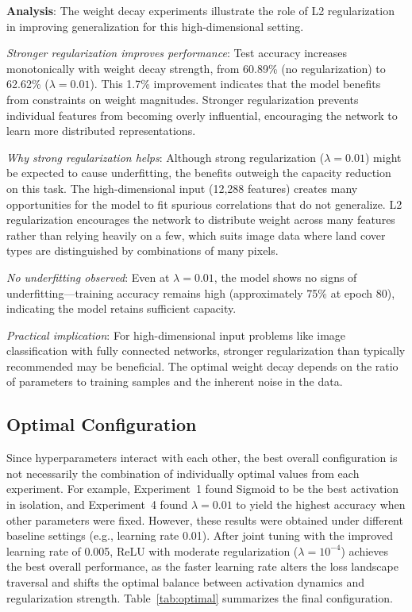\documentclass[sigconf,nonacm]{acmart}
\begin{document}
\textbf{Analysis}: The weight decay experiments illustrate the role of L2 regularization in improving generalization for this high-dimensional setting.

\textit{Stronger regularization improves performance}: Test accuracy increases monotonically with weight decay strength, from 60.89\% (no regularization) to 62.62\% ($\lambda=0.01$). This 1.7\% improvement indicates that the model benefits from constraints on weight magnitudes. Stronger regularization prevents individual features from becoming overly influential, encouraging the network to learn more distributed representations.

\textit{Why strong regularization helps}: Although strong regularization ($\lambda=0.01$) might be expected to cause underfitting, the benefits outweigh the capacity reduction on this task. The high-dimensional input (12,288 features) creates many opportunities for the model to fit spurious correlations that do not generalize. L2 regularization encourages the network to distribute weight across many features rather than relying heavily on a few, which suits image data where land cover types are distinguished by combinations of many pixels.

\textit{No underfitting observed}: Even at $\lambda=0.01$, the model shows no signs of underfitting---training accuracy remains high (approximately 75\% at epoch 80), indicating the model retains sufficient capacity.

\textit{Practical implication}: For high-dimensional input problems like image classification with fully connected networks, stronger regularization than typically recommended may be beneficial. The optimal weight decay depends on the ratio of parameters to training samples and the inherent noise in the data.

\subsection{Optimal Configuration}

Since hyperparameters interact with each other, the best overall configuration is not necessarily the combination of individually optimal values from each experiment. For example, Experiment~1 found Sigmoid to be the best activation in isolation, and Experiment~4 found $\lambda=0.01$ to yield the highest accuracy when other parameters were fixed. However, these results were obtained under different baseline settings (e.g., learning rate 0.01). After joint tuning with the improved learning rate of 0.005, ReLU with moderate regularization ($\lambda=10^{-4}$) achieves the best overall performance, as the faster learning rate alters the loss landscape traversal and shifts the optimal balance between activation dynamics and regularization strength. Table~\ref{tab:optimal} summarizes the final configuration.
\end{document}
